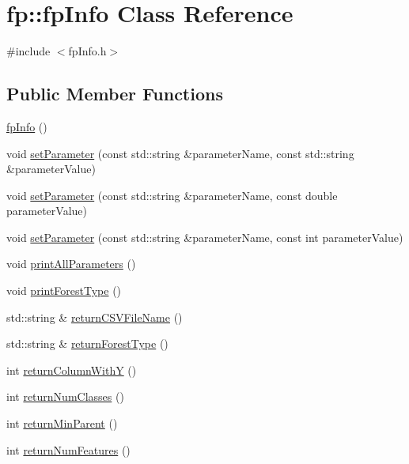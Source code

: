 \hypertarget{classfp_1_1fpInfo}{}\section{fp\+:\+:fp\+Info Class Reference}
\label{classfp_1_1fpInfo}


{\ttfamily \#include $<$fp\+Info.\+h$>$}

\subsection*{Public Member Functions}
\begin{DoxyCompactItemize}
\item 
\hyperlink{classfp_1_1fpInfo_a2a0f7c8215dd138b690efe8a03484aef}{fp\+Info} ()
\item 
void \hyperlink{classfp_1_1fpInfo_ae4c749c466e983cb312cc08d38b2796e}{set\+Parameter} (const std\+::string \&parameter\+Name, const std\+::string \&parameter\+Value)
\item 
void \hyperlink{classfp_1_1fpInfo_a8ef4332ee98a1724ffd8614c4f80af91}{set\+Parameter} (const std\+::string \&parameter\+Name, const double parameter\+Value)
\item 
void \hyperlink{classfp_1_1fpInfo_aa2dd574c5a3764c250f1ccb1b11de1e0}{set\+Parameter} (const std\+::string \&parameter\+Name, const int parameter\+Value)
\item 
void \hyperlink{classfp_1_1fpInfo_a471bd46c828547d5b556f6f4e9fca70f}{print\+All\+Parameters} ()
\item 
void \hyperlink{classfp_1_1fpInfo_a1acfffe3b13e5cad548f92cd09ff7f46}{print\+Forest\+Type} ()
\item 
std\+::string \& \hyperlink{classfp_1_1fpInfo_a78c57a1955263d343c794f2156cd0a76}{return\+C\+S\+V\+File\+Name} ()
\item 
std\+::string \& \hyperlink{classfp_1_1fpInfo_a97280e7e3cadc5e653d8ef256eb2c82d}{return\+Forest\+Type} ()
\item 
int \hyperlink{classfp_1_1fpInfo_a52ef3c184d39133dae472bb51e1287e7}{return\+Column\+WithY} ()
\item 
int \hyperlink{classfp_1_1fpInfo_a641516fa21a5d6170f74426cf9e2b255}{return\+Num\+Classes} ()
\item 
int \hyperlink{classfp_1_1fpInfo_ad1af845e85cb6e807694c5106baca230}{return\+Min\+Parent} ()
\item 
int \hyperlink{classfp_1_1fpInfo_abf1e1bfc3e7daa178f3d68bed6311edb}{return\+Num\+Features} ()
\item 

\end{DoxyCompactItemize}
